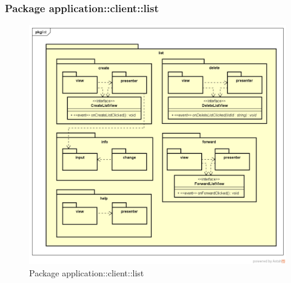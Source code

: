 \subsubsection{Package application::client::list}
\label{Package application::client::list}
\begin{figure}[H]
	\centering
	\includegraphics[scale=0.5]{Sezioni/Packages/App/pck_client_list.png}
	\caption{Package application::client::list}
\end{figure}
